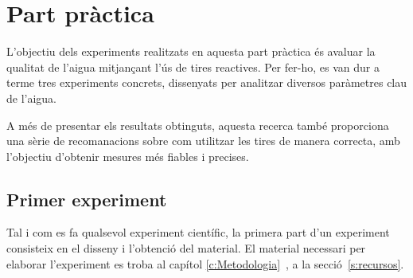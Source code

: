 \chapter{Part pràctica}
\label{c:Partpra}

L’objectiu dels experiments realitzats en aquesta part pràctica és avaluar la qualitat de l’aigua mitjançant l’ús de tires reactives. Per fer-ho, es van dur a terme tres experiments concrets, dissenyats per analitzar diversos paràmetres clau de l’aigua.

A més de presentar els resultats obtinguts, aquesta recerca també proporciona una sèrie de recomanacions sobre com utilitzar les tires de manera correcta, amb l’objectiu d’obtenir mesures més fiables i precises.


\section{Primer experiment}


Tal i com es fa qualsevol experiment científic, la primera part d'un experiment consisteix en el disseny i l'obtenció del material. El material necessari per elaborar l'experiment es troba al capítol \ref{c:Metodologia}~, a la secció~\ref{s:recursos}.


